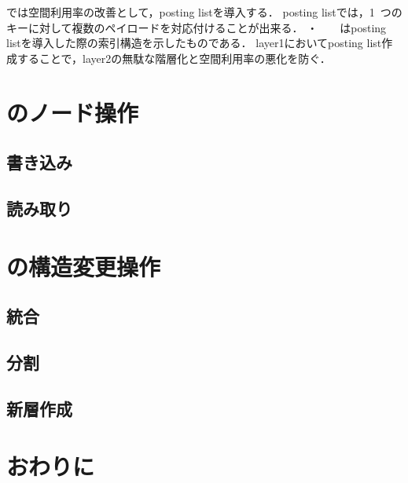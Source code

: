 \Bcforest{}では空間利用率の改善として，posting listを導入する．
posting listでは，1~つのキーに対して複数のペイロードを対応付けることが出来る．
・　　はposting listを導入した際の索引構造を示したものである．
layer1においてposting list作成することで，layer2の無駄な階層化と空間利用率の悪化を防ぐ．


\section{\Bcforest{}のノード操作}
\label{sec:node_operation}

\subsection{書き込み}

\subsection{読み取り}

\section{\Bcforest{}の構造変更操作}
\label{sec:smo}

\subsection{統合}
\subsection{分割}
\subsection{新層作成}

\section{おわりに}
\label{sec:conclusion}

